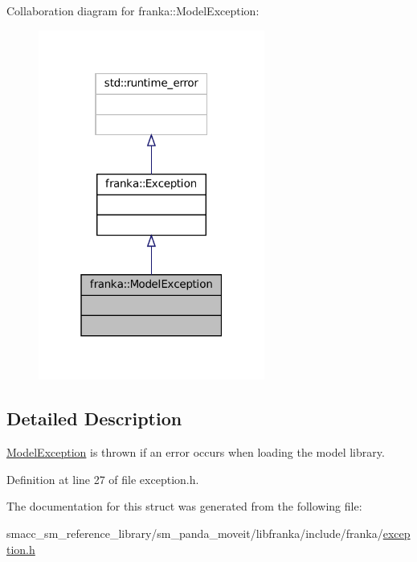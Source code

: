 Collaboration diagram for franka\+:\+:Model\+Exception\+:
\nopagebreak
\begin{figure}[H]
\begin{center}
\leavevmode
\includegraphics[width=211pt]{structfranka_1_1ModelException__coll__graph}
\end{center}
\end{figure}


\subsection{Detailed Description}
\hyperlink{structfranka_1_1ModelException}{Model\+Exception} is thrown if an error occurs when loading the model library. 

Definition at line 27 of file exception.\+h.



The documentation for this struct was generated from the following file\+:\begin{DoxyCompactItemize}
\item 
smacc\+\_\+sm\+\_\+reference\+\_\+library/sm\+\_\+panda\+\_\+moveit/libfranka/include/franka/\hyperlink{exception_8h}{exception.\+h}\end{DoxyCompactItemize}
